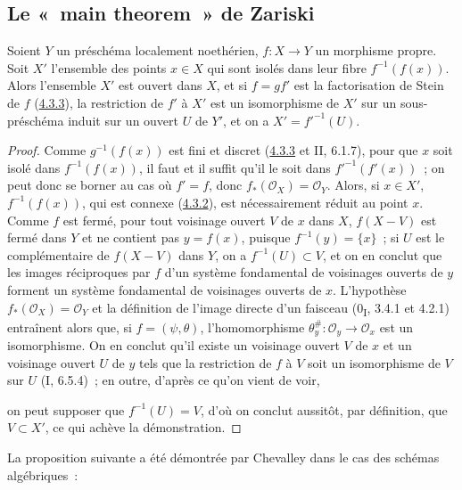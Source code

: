 \subsection{Le «~main theorem~» de Zariski}
\label{subsection:III.4.4-fr}

\begin{proposition}[4.4.1]
\label{III.4.4.1-fr}
Soient $Y$ un préschéma localement noethérien, $f:X\to Y$ un morphisme
propre. Soit $X'$ l'ensemble des points $x\in X$ qui sont isolés dans leur
fibre $f^{-1}(f(x))$. Alors l'ensemble $X'$ est ouvert dans $X$, et si
$f=gf'$ est la factorisation de Stein de $f$
(\hyperref[III.4.3.3-fr]{4.3.3}), la restriction de $f'$ à $X'$ est un
isomorphisme de $X'$ sur un sous-préschéma induit sur un ouvert $U$ de $Y'$,
et on a $X'=f'^{-1}(U)$.
\end{proposition}

\begin{proof}
Comme $g^{-1}(f(x))$ est fini et discret
(\hyperref[III.4.3.3-fr]{4.3.3} et II, 6.1.7), pour que $x$ soit isolé dans
$f^{-1}(f(x))$, il faut et il suffit qu'il le soit dans
$f'^{-1}(f'(x))$~; on peut donc se borner au cas où $f'=f$, donc
$f_*(\mathcal O_X)=\mathcal O_Y$. Alors, si $x\in X'$,
$f^{-1}(f(x))$, qui est connexe (\hyperref[III.4.3.2-fr]{4.3.2}), est
nécessairement réduit au point $x$. Comme $f$ est fermé, pour tout voisinage
ouvert $V$ de $x$ dans $X$, $f(X-V)$ est fermé dans $Y$ et ne contient pas
$y=f(x)$, puisque $f^{-1}(y)=\{x\}$~; si $U$ est le complémentaire de
$f(X-V)$ dans $Y$, on a $f^{-1}(U)\subset V$, et on en conclut que les
images réciproques par $f$ d'un système fondamental de voisinages ouverts de
$y$ forment un système fondamental de voisinages ouverts de $x$. L'hypothèse
$f_*(\mathcal O_X)=\mathcal O_Y$ et la définition de l'image directe d'un
faisceau (0\textsubscript{I}, 3.4.1 et 4.2.1) entraînent alors que, si
$f=(\psi,\theta)$, l'homomorphisme
$\theta_y^\#:\mathcal O_y\to\mathcal O_x$ est un isomorphisme. On en conclut
qu'il existe un voisinage ouvert $V$ de $x$ et un voisinage ouvert $U$ de
$y$ tels que la restriction de $f$ à $V$ soit un isomorphisme de $V$ sur
$U$ (I, 6.5.4)~; en outre, d'après ce qu'on vient de voir,


on peut supposer que $f^{-1}(U)=V$, d'où on conclut aussitôt, par définition,
que $V\subset X'$, ce qui achève la démonstration.
\end{proof}

La proposition suivante a été démontrée par Chevalley dans le cas des schémas
algébriques~:

